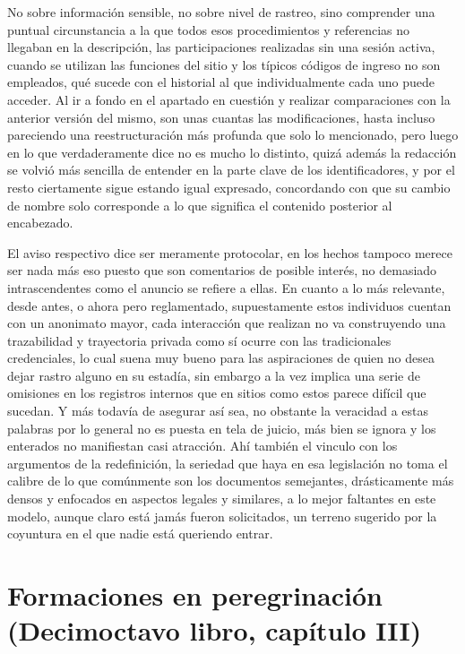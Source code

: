 \documentclass[
]{book}
\begin{document}
No sobre información sensible, no sobre nivel de rastreo, sino comprender una puntual circunstancia a la que todos esos procedimientos y referencias no llegaban en la descripción, las participaciones realizadas sin una sesión activa, cuando se utilizan las funciones del sitio y los típicos códigos de ingreso no son empleados, qué sucede con el historial al que individualmente cada uno puede acceder. Al ir a fondo en el apartado en cuestión y realizar comparaciones con la anterior versión del mismo, son unas cuantas las modificaciones, hasta incluso pareciendo una reestructuración más profunda que solo lo mencionado, pero luego en lo que verdaderamente dice no es mucho lo distinto, quizá además la redacción se volvió más sencilla de entender en la parte clave de los identificadores, y por el resto ciertamente sigue estando igual expresado, concordando con que su cambio de nombre solo corresponde a lo que significa el contenido posterior al encabezado.

El aviso respectivo dice ser meramente protocolar, en los hechos tampoco merece ser nada más eso puesto que son comentarios de posible interés, no demasiado intrascendentes como el anuncio se refiere a ellas. En cuanto a lo más relevante, desde antes, o ahora pero reglamentado, supuestamente estos individuos cuentan con un anonimato mayor, cada interacción que realizan no va construyendo una trazabilidad y trayectoria privada como sí ocurre con las tradicionales credenciales, lo cual suena muy bueno para las aspiraciones de quien no desea dejar rastro alguno en su estadía, sin embargo a la vez implica una serie de omisiones en los registros internos que en sitios como estos parece difícil que sucedan. Y más todavía de asegurar así sea, no obstante la veracidad a estas palabras por lo general no es puesta en tela de juicio, más bien se ignora y los enterados no manifiestan casi atracción. Ahí también el vinculo con los argumentos de la redefinición, la seriedad que haya en esa legislación no toma el calibre de lo que comúnmente son los documentos semejantes, drásticamente más densos y enfocados en aspectos legales y similares, a lo mejor faltantes en este modelo, aunque claro está jamás fueron solicitados, un terreno sugerido por la coyuntura en el que nadie está queriendo entrar.

\hypertarget{formaciones-en-peregrinaciuxf3n-decimoctavo-libro-capuxedtulo-iii}{%
\section{Formaciones en peregrinación (Decimoctavo libro, capítulo III)}\label{formaciones-en-peregrinaciuxf3n-decimoctavo-libro-capuxedtulo-iii}}
\end{document}
